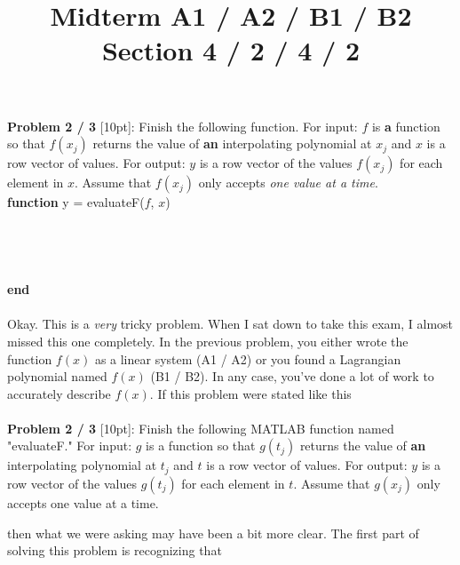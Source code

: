 \documentclass{article}
\begin{document}
 
 
 
\title{
    \textmd{\Huge{Midterm A1 / A2 / B1 / B2 }}\\
    \textmd{\huge{Section 4 / 2 / 4 / 2}}
}


\maketitle


\textbf{Problem 2 / 3} [10pt]: Finish the following function. For input: $f$ is \textbf{a} function so that $f(x_j)$ returns the value of \textbf{an} interpolating polynomial at $x_j$ and $x$ is a row vector of values. For output: $y$ is a row vector of the values $f(x_j)$ for each element in $x$. Assume that $f(x_j)$ only accepts \textit{one value at a time}.\\

\textbf{function} y = evaluateF($f$, $x$)\\
\\
\\
\\ 
\\ 

\textbf{end} \\
\\


Okay. This is a \textit{very} tricky problem. When I sat down to take this exam, I almost missed this one completely. In the previous problem, you either wrote the function $f(x)$ as a linear system (A1 / A2) or you found a Lagrangian polynomial named $f(x)$  (B1 / B2). In any case, you've done a lot of work to accurately describe $f(x)$. If this problem were stated like this \\
\\

\textbf{Problem 2 / 3} [10pt]: Finish the following MATLAB function named "evaluateF." For input: $g$ is a function so that $g(t_j)$ returns the value of \textbf{an} interpolating polynomial at $t_j$ and $t$ is a row vector of values. For output: $y$ is a row vector of the values $g(t_j)$ for each element in $t$. Assume that $g(x_j)$ only accepts one value at a time.

 


{\setlength{\parindent}{0cm}
then what we were asking may have been a bit more clear. The first part of solving this problem is recognizing that }\\
\end{document}
